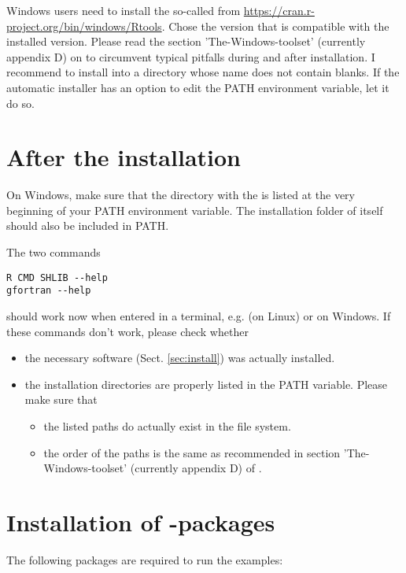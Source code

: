 \documentclass[10pt,a4paper]{article}
\begin{document}
Windows users need to install the so-called  from \url{https://cran.r-project.org/bin/windows/Rtools}. Chose the version that is compatible with the installed  version. Please read the section 'The-Windows-toolset' (currently appendix D) on \radmin{} to circumvent typical pitfalls during and after installation. I recommend to install into a directory whose name does not contain blanks. If the automatic installer has an option to edit the PATH environment variable, let it do so. 

\section{After the installation} \label{sec:postInstall}

On Windows, make sure that the directory with the  is listed at the very beginning of your PATH environment variable. The installation folder of  itself should also be included in PATH.

The two commands

\begin{verbatim}
R CMD SHLIB --help
gfortran --help
\end{verbatim}

should work now when entered in a terminal, e.g.  (on Linux) or  on Windows. If these commands don't work, please check whether
\begin{itemize}
  \item the necessary software (Sect. \ref{sec:install}) was actually installed.
  \item the installation directories are properly listed in the PATH variable. Please make sure that
	\begin{itemize}
	  \item the listed paths do actually exist in the file system.
	  \item the order of the paths is the same as recommended in section 'The-Windows-toolset' (currently appendix D) of \radmin.
	  
	\end{itemize}  
\end{itemize}

\section{Installation of -packages}

The following packages are required to run the examples:
\end{document}
